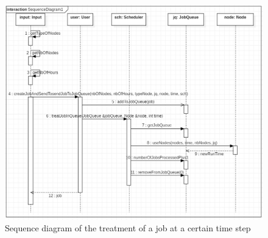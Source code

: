 \documentclass [10 pt, a4 paper]{report}
\begin{document}
\\ \\

\begin{figure}[!htbp]
\centering
\includegraphics[width=1.3\textwidth]{SequenceDiag.jpg}
\caption{\label{fig:image} Sequence diagram of the treatment of a job at a certain time step}
\end{figure}
\\
\end{document}
